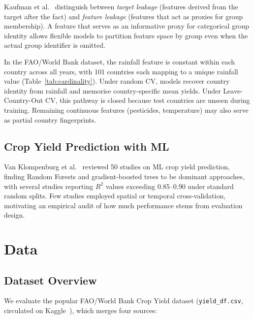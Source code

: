 \documentclass[conference]{IEEEtran}
\begin{document}
Kaufman et al.~\cite{kaufman2012leakage} distinguish between \emph{target leakage} 
(features derived from the target after the fact) and \emph{feature leakage} 
(features that act as proxies for group membership). A feature that serves 
as an informative proxy for categorical group identity allows flexible models 
to partition feature space by group even when the actual group identifier is 
omitted.

In the FAO/World Bank dataset, the rainfall feature is constant within each 
country across all years, with 101 countries each mapping to a unique rainfall 
value (Table~\ref{tab:cardinality}). Under random CV, models recover country 
identity from rainfall and memorise country-specific mean yields. Under 
Leave-Country-Out CV, this pathway is closed because test countries are unseen 
during training. Remaining continuous features (pesticides, temperature) may 
also serve as partial country fingerprints.

\subsection{Crop Yield Prediction with ML}

Van Klompenburg et al.~\cite{vanklompenburg2020} reviewed 50 studies on ML 
crop yield prediction, finding Random Forests and gradient-boosted trees 
to be dominant approaches, with several studies reporting $R^2$ values 
exceeding 0.85--0.90 under standard random splits. Few studies employed 
spatial or temporal cross-validation, motivating an empirical audit of 
how much performance stems from evaluation design.

\section{Data}
\label{sec:data}

\subsection{Dataset Overview}

We evaluate the popular FAO/World Bank Crop Yield dataset 
(\texttt{yield\_df.csv}, circulated on Kaggle~\cite{kaggle_cropyield}), 
which merges four sources:
\end{document}
